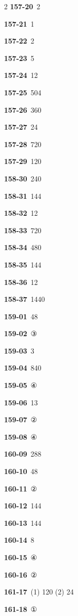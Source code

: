 \documentclass[10pt,a4paper]{article}
\begin{document}
\begin{multicols}{2}
\noindent\textbf{157-20}\ 2\par
\noindent\textbf{157-21}\ 1\par
\noindent\textbf{157-22}\ 2\par
\noindent\textbf{157-23}\ 5\par
\noindent\textbf{157-24}\ 12\par
\noindent\textbf{157-25}\ 504\par
\noindent\textbf{157-26}\ 360\par
\noindent\textbf{157-27}\ 24\par
\noindent\textbf{157-28}\ 720\par
\noindent\textbf{157-29}\ 120\par
\noindent\textbf{158-30}\ 240\par
\noindent\textbf{158-31}\ 144\par
\noindent\textbf{158-32}\ 12\par
\noindent\textbf{158-33}\ 720\par
\noindent\textbf{158-34}\ 480\par
\noindent\textbf{158-35}\ 144\par
\noindent\textbf{158-36}\ 12\par
\noindent\textbf{158-37}\ 1440\par
\noindent\textbf{159-01}\ 48\par
\noindent\textbf{159-02}\ ③\par
\noindent\textbf{159-03}\ 3\par
\noindent\textbf{159-04}\ 840\par
\noindent\textbf{159-05}\ ④\par
\noindent\textbf{159-06}\ 13\par
\noindent\textbf{159-07}\ ②\par
\noindent\textbf{159-08}\ ④\par
\noindent\textbf{160-09}\ 288\par
\noindent\textbf{160-10}\ 48\par
\noindent\textbf{160-11}\ ②\par
\noindent\textbf{160-12}\ 144\par
\noindent\textbf{160-13}\ 144\par
\noindent\textbf{160-14}\ 8\par
\noindent\textbf{160-15}\ ④\par
\noindent\textbf{160-16}\ ②\par
\noindent\textbf{161-17}\ (1) 120 (2) 24\par
\noindent\textbf{161-18}\ ①\par

\end{multicols}
\end{document}
